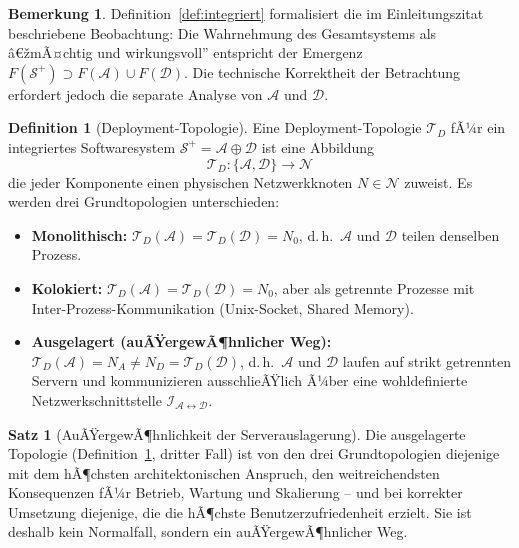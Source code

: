 ﻿\documentclass[a4paper,12pt]{article}
\theoremstyle{definition}
\newtheorem{definition}{Definition}
\newtheorem{satz}{Satz}
\newtheorem{bemerkung}{Bemerkung}
\begin{document}
\begin{bemerkung}
Definition~\ref{def:integriert} formalisiert die im Einleitungszitat beschriebene Beobachtung: Die Wahrnehmung des Gesamtsystems als â€žmÃ¤chtig und wirkungsvoll'' entspricht der Emergenz $F(\mathcal{S}^+) \supset F(\mathcal{A}) \cup F(\mathcal{D})$. Die technische Korrektheit der Betrachtung erfordert jedoch die separate Analyse von $\mathcal{A}$ und $\mathcal{D}$.
\end{bemerkung}

\begin{definition}[Deployment-Topologie]
\label{def:topologie}
Eine Deployment-Topologie $\mathcal{T}_D$ fÃ¼r ein integriertes Softwaresystem $\mathcal{S}^+ = \mathcal{A} \oplus \mathcal{D}$ ist eine Abbildung
\[
\mathcal{T}_D: \{\mathcal{A}, \mathcal{D}\} \to \mathcal{N}
\]
die jeder Komponente einen physischen Netzwerkknoten $N \in \mathcal{N}$ zuweist. Es werden drei Grundtopologien unterschieden:
\begin{itemize}
  \item \textbf{Monolithisch:} $\mathcal{T}_D(\mathcal{A}) = \mathcal{T}_D(\mathcal{D}) = N_0$, d.\,h.\ $\mathcal{A}$ und $\mathcal{D}$ teilen denselben Prozess.
  \item \textbf{Kolokiert:} $\mathcal{T}_D(\mathcal{A}) = \mathcal{T}_D(\mathcal{D}) = N_0$, aber als getrennte Prozesse mit Inter-Prozess-Kommunikation (Unix-Socket, Shared Memory).
  \item \textbf{Ausgelagert (auÃŸergewÃ¶hnlicher Weg):} $\mathcal{T}_D(\mathcal{A}) = N_A \neq N_D = \mathcal{T}_D(\mathcal{D})$, d.\,h.\ $\mathcal{A}$ und $\mathcal{D}$ laufen auf strikt getrennten Servern und kommunizieren ausschlieÃŸlich Ã¼ber eine wohldefinierte Netzwerkschnittstelle $\mathcal{I}_{\mathcal{A} \leftrightarrow \mathcal{D}}$.
\end{itemize}
\end{definition}

\begin{satz}[AuÃŸergewÃ¶hnlichkeit der Serverauslagerung]
\label{satz:auslagerung}
Die ausgelagerte Topologie (Definition~\ref{def:topologie}, dritter Fall) ist von den drei Grundtopologien diejenige mit dem hÃ¶chsten architektonischen Anspruch, den weitreichendsten Konsequenzen fÃ¼r Betrieb, Wartung und Skalierung -- und bei korrekter Umsetzung diejenige, die die hÃ¶chste Benutzerzufriedenheit erzielt. Sie ist deshalb kein Normalfall, sondern ein auÃŸergewÃ¶hnlicher Weg.
\end{satz}
\end{document}
